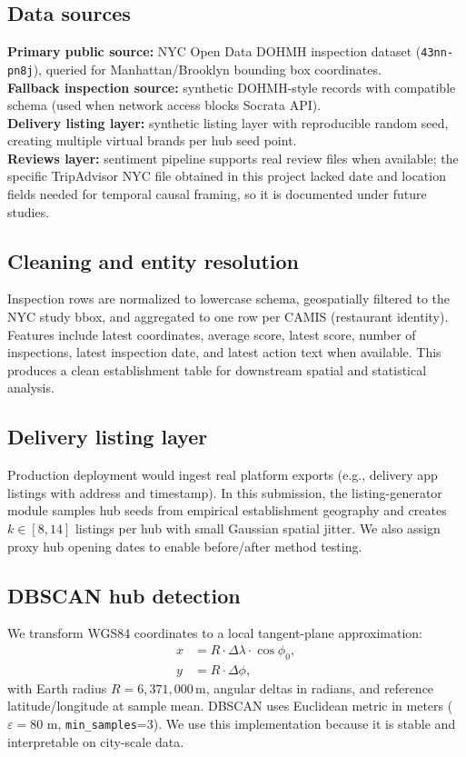\documentclass[10pt,twocolumn]{article}
\begin{document}
\subsection{Data sources}
\textbf{Primary public source:} NYC Open Data DOHMH inspection dataset (\texttt{43nn-pn8j}), queried for Manhattan/Brooklyn bounding box coordinates. \\
\textbf{Fallback inspection source:} synthetic DOHMH-style records with compatible schema (used when network access blocks Socrata API). \\
\textbf{Delivery listing layer:} synthetic listing layer with reproducible random seed, creating multiple virtual brands per hub seed point. \\
\textbf{Reviews layer:} sentiment pipeline supports real review files when available; the specific TripAdvisor NYC file obtained in this project lacked date and location fields needed for temporal causal framing, so it is documented under future studies.

\subsection{Cleaning and entity resolution}
Inspection rows are normalized to lowercase schema, geospatially filtered to the NYC study bbox, and aggregated to one row per CAMIS (restaurant identity). Features include latest coordinates, average score, latest score, number of inspections, latest inspection date, and latest action text when available. This produces a clean establishment table for downstream spatial and statistical analysis.

\subsection{Delivery listing layer}
Production deployment would ingest real platform exports (e.g., delivery app listings with address and timestamp). In this submission, the listing-generator module samples hub seeds from empirical establishment geography and creates $k \in [8,14]$ listings per hub with small Gaussian spatial jitter. We also assign proxy hub opening dates to enable before/after method testing.

\subsection{DBSCAN hub detection}
We transform WGS84 coordinates to a local tangent-plane approximation:
\begin{align}
x &= R\cdot \Delta\lambda \cdot \cos\phi_0,\\
y &= R\cdot \Delta\phi,
\end{align}
with Earth radius $R{=}6{,}371{,}000$\,m, angular deltas in radians, and reference latitude/longitude at sample mean. DBSCAN uses Euclidean metric in meters ($\varepsilon=80$ m, \texttt{min\_samples}=3). We use this implementation because it is stable and interpretable on city-scale data.
\end{document}
